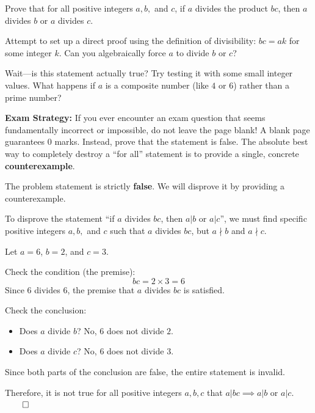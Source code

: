 
\begin{problem}
Prove that for all positive integers $a, b,$ and $c$, if $a$ divides the product $bc$, then $a$ divides $b$ or $a$ divides $c$.
\end{problem}

\begin{hint}
Attempt to set up a direct proof using the definition of divisibility: $bc = ak$ for some integer $k$. Can you algebraically force $a$ to divide $b$ or $c$?

Wait—is this statement actually true? Try testing it with some small integer values. What happens if $a$ is a composite number (like $4$ or $6$) rather than a prime number?

\textbf{Exam Strategy:} If you ever encounter an exam question that seems fundamentally incorrect or impossible, do not leave the page blank! A blank page guarantees 0 marks. Instead, prove that the statement is false. The absolute best way to completely destroy a ``for all'' statement is to provide a single, concrete \textbf{counterexample}.
\end{hint}

\begin{solution}
The problem statement is strictly \textbf{false}. We will disprove it by providing a counterexample.

To disprove the statement ``if $a$ divides $bc$, then $a|b$ or $a|c$'', we must find specific positive integers $a, b,$ and $c$ such that $a$ divides $bc$, but $a \nmid b$ and $a \nmid c$.

Let $a = 6$, $b = 2$, and $c = 3$.

Check the condition (the premise):
\[
bc = 2 \times 3 = 6
\]
Since $6$ divides $6$, the premise that $a$ divides $bc$ is satisfied.

Check the conclusion:
\begin{itemize}
    \item Does $a$ divide $b$? No, $6$ does not divide $2$.
    \item Does $a$ divide $c$? No, $6$ does not divide $3$.
\end{itemize}

Since both parts of the conclusion are false, the entire statement is invalid.

Therefore, it is not true for all positive integers $a, b, c$ that $a|bc \implies a|b \text{ or } a|c$. $\qed$
\end{solution}

